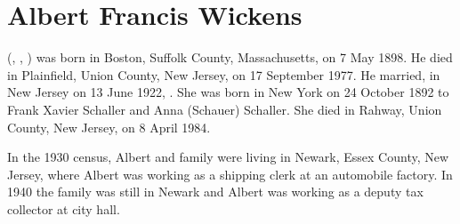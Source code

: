 \section{Albert Francis Wickens}\label{per:Albert4Wickens}

 (, , ) was born in Boston, Suffolk County, Massachusetts, on 7 May 1898.\cite{Albert4WickensBirth} He died in Plainfield, Union County, New Jersey, on 17 September 1977.\cite{Albert4WickensDeath} He married, in New Jersey on 13 June 1922, .\cite{Albert4WickensMarriage} She was born in New York on 24 October 1892\cite{MarySchallerDeath:1} to Frank Xavier Schaller and Anna (Schauer) Schaller.\cite{Census1900MarySchaller:2} She died in Rahway, Union County, New Jersey, on 8 April 1984.\cite{MarySchallerDeath:2}

In the 1930 census, Albert and family were living in Newark, Essex County, New Jersey, where Albert was working as a shipping clerk at an automobile factory.\cite{Census1930AlbertWickens} In 1940 the family was still in Newark and Albert was working as a deputy tax collector at city hall.\cite{Census1940AlbertWickens}


